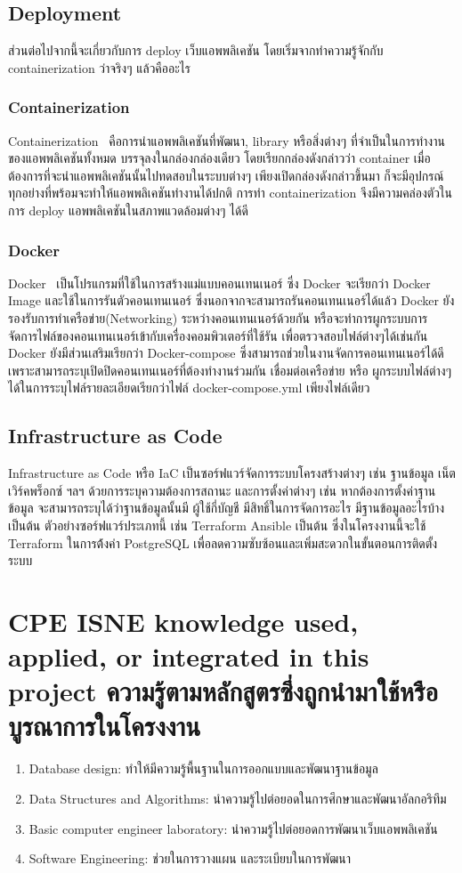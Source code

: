 \subsection{Deployment}
ส่วนต่อไปจากนี้จะเกี่ยวกับการ deploy เว็บแอพพลิเคชัน โดยเริ่มจากทำความรู้จักกับ 
containerization ว่าจริงๆ แล้วคืออะไร
\subsubsection{Containerization}
Containerization~\cite{ctnrh} คือการนำแอพพลิเคชันที่พัฒนา, library หรือสิ่งต่างๆ 
ที่จำเป็นในการทำงานของแอพพลิเคชันทั้งหมด บรรจุลงในกล่องกล่องเดียว โดยเรียกกล่องดังกล่าวว่า container 
เมื่อต้องการที่จะนำแอพพลิเคชันนั้นไปทดสอบในระบบต่างๆ เพียงเปิดกล่องดังกล่าวขึ้นมา
ก็จะมีอุปกรณ์ทุกอย่างที่พร้อมจะทำให้แอพพลิเคชันทำงานได้ปกติ การทำ containerization 
จึงมีความคล่องตัวในการ deploy แอพพลิเคชันในสภาพแวดล้อมต่างๆ ได้ดี 
\subsubsection{Docker}
Docker~\cite{dke} เป็นโปรแกรมที่ใช้ในการสร้างแม่แบบคอนเทนเนอร์ ซึ่ง Docker จะเรียกว่า Docker Image และใช้ในการรันตัวคอนเทนเนอร์
ซึ่งนอกจากจะสามารถรันคอนเทนเนอร์ได้แล้ว Docker ยังรองรับการทำเครือข่าย(Networking) ระหว่างคอนเทนเนอร์ด้วยกัน 
หรือจะทำการผูกระบบการจัดการไฟล์ของคอนเทนเนอร์เข้ากับเครื่องคอมพิวเตอร์ที่ใช้รัน เพื่อตรวจสอบไฟล์ต่างๆได้เช่นกัน
Docker ยังมีส่วนเสริมเรียกว่า Docker-compose ซึ่งสามารถช่วยในงานจัดการคอนเทนเนอร์ได้ดี เพราะสามารถระบุเปิดปิดคอนเทนเนอร์ที่ต้องทำงานร่วมกัน 
เชื่อมต่อเครือข่าย หรือ ผูกระบบไฟล์ต่างๆ ได้ในการระบุไฟล์รายละเอียดเรียกว่าไฟล์ docker-compose.yml เพียงไฟล์เดียว
\subsection{Infrastructure as Code}
Infrastructure as Code หรือ IaC เป็นซอร์ฟแวร์จัดการระบบโครงสร้างต่างๆ เช่น ฐานข้อมูล เน็ตเวิร์คพร็อกซ์ ฯลฯ 
ด้วยการระบุความต้องการสถานะ และการตั้งค่าต่างๆ เช่น หากต้องการตั้งค่าฐานข้อมูล จะสามารถระบุได้ว่าฐานข้อมูลนั้นมี ผู้ใช้กี่บัญชี 
มีสิทธิ์ในการจัดการอะไร มีฐานข้อมูลอะไรบ้าง เป็นต้น ตัวอย่างซอร์ฟแวร์ประเภทนี้ เช่น Terraform Ansible เป็นต้น
ซึ่งในโครงงานนี้จะใช้ Terraform ในการต้้งค่า PostgreSQL เพื่อลดความซับซ้อนและเพิ่มสะดวกในขั้นตอนการติดตั้งระบบ

\section{\ifenglish%
        \ifcpe CPE \else ISNE \fi knowledge used, applied, or integrated in this project
  \else%
        ความรู้ตามหลักสูตรซึ่งถูกนำมาใช้หรือบูรณาการในโครงงาน
  \fi
 }
\begin{enumerate}
      \item Database design: ทำให้มีความรู้พื้นฐานในการออกแบบและพัฒนาฐานข้อมูล
      \item Data Structures and Algorithms: นำความรู้ไปต่อยอดในการศึกษาและพัฒนาอัลกอริทึม
      \item Basic computer engineer laboratory: นำความรู้ไปต่อยอดการพัฒนาเว็บแอพพลิเคชัน
      \item Software Engineering: ช่วยในการวางแผน และระเบียบในการพัฒนา
\end{enumerate}


